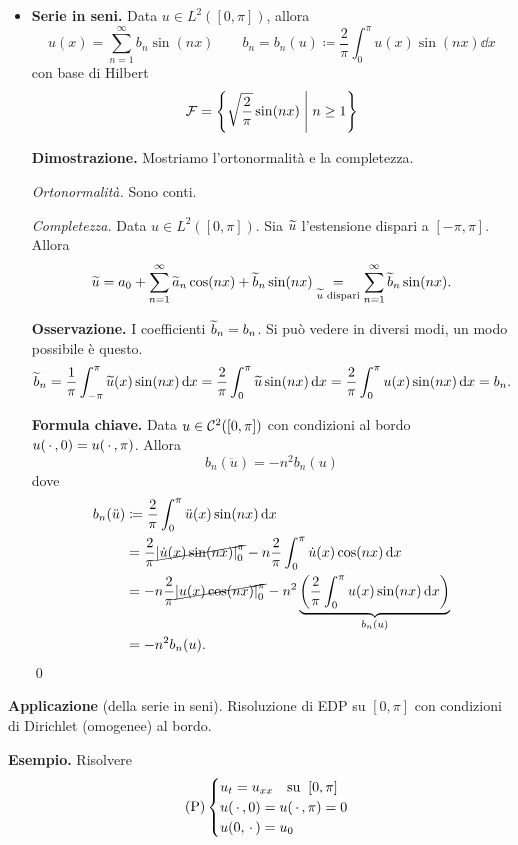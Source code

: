 \begin{itemize}
	\item \textbf{Serie in seni.} Data $u \in L^2([0,\pi])$, allora 
	$$
		u(x) = \sum_{n=1}^\infty b_n \sin(nx) \qquad 
		b_n = b_n(u) \coloneqq  \frac{2}{\pi} \int_0^\pi u(x) \sin(nx) \dd x
	$$
	con base di Hilbert 
	$$
		\mathcal{F} = \left\{ \sqrt{\frac{2}{\pi}} \sin(nx) \;\middle|\; n \geq 1 \right\}
	$$

	\textbf{Dimostrazione.} Mostriamo l'ortonormalità e la completezza.

	\textit{Ortonormalità.} Sono conti.

	\textit{Completezza.} Data $u \in L^2([0,\pi])$. Sia $\widetilde{u}$ l'estensione dispari a $[-\pi,\pi]$. Allora 
	$$
		\widetilde{u} = a_0 + \sum_{n=1}^{\infty} \widetilde{a}_n \cos(nx) + \widetilde{b}_n \sin(nx)
		\underset{\widetilde{u} \text{ dispari}} = \sum_{n=1}^{\infty} \widetilde{b}_n \sin(nx).
	$$

	\textbf{Osservazione.} I coefficienti $\widetilde{b}_n = b_n$. Si può vedere in diversi modi, un modo possibile è questo.
	$$
		\widetilde{b}_n = \frac{1}{\pi} \int_{-\pi}^{\pi} \widetilde{u}(x) \sin(nx) \,\mathrm{d} x 
		= \frac{2}{\pi} \int_{0}^{\pi} \widetilde{u} \sin(nx) \,\mathrm{d} x 
		= \frac{2}{\pi} \int_{0}^{\pi} u(x) \sin(nx) \,\mathrm{d} x 
		= b_n.
	$$

	\textbf{Formula chiave.} Data $u \in \mathcal{C}^2 ([0,\pi])$ con condizioni al bordo $u(\,\cdot\,, 0) = u(\,\cdot\,, \pi)$. 
	Allora
	$$
		b_n(\ddot u) = -n^2 b_n(u)
	$$
	dove 
	\begin{align*}
		b_n(\ddot u) & \coloneqq \frac{2}{\pi} \int_0^\pi \ddot u(x) \sin(nx) \,\mathrm{d} x \\
		& = \frac{2}{\pi} \cancel{\left| \dot u(x) \sin(nx) \right|_0^\pi} - n\frac{2}{\pi} \int_{0}^{\pi} \dot u(x) \cos(nx) \,\mathrm{d} x \\
		& = -n \frac{2}{\pi} \cancel{\left| u(x) \cos(nx) \right|_0^\pi} - n^2  \underbrace{\left( \frac{2}{\pi} \int_{0}^{\pi} u(x) \sin(nx) \,\mathrm{d} x \right)}_{b_n(u)} \\
		& = -n^2 b_n(u).
	\end{align*}
	\qed

\end{itemize}


\textbf{Applicazione} (della serie in seni). Risoluzione di EDP su $[0,\pi]$ con condizioni di Dirichlet (omogenee) al bordo.

\textbf{Esempio.} Risolvere
%
\begin{equation}
\label{eq:24nov-problema-1} \tag{P}
	\begin{cases}
		u_t = u_{xx} \quad \text{su} \;\; [0,\pi] \\
		u(\,\cdot\,, 0) = u(\,\cdot\,,\pi) = 0 \\
		u(0,\,\cdot\,) = u_0
	\end{cases} 
\end{equation}


